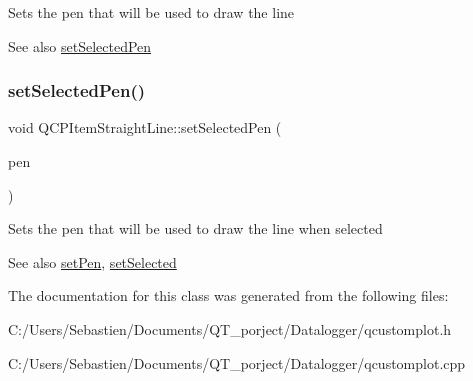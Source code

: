 Sets the pen that will be used to draw the line

\begin{DoxySeeAlso}{See also}
\hyperlink{class_q_c_p_item_straight_line_a5c33559498d33543fa95cf0a36e851ff}{set\+Selected\+Pen} 
\end{DoxySeeAlso}
\mbox{\label{class_q_c_p_item_straight_line_a5c33559498d33543fa95cf0a36e851ff}} 
\subsubsection{\texorpdfstring{set\+Selected\+Pen()}{setSelectedPen()}}
{\footnotesize\ttfamily void Q\+C\+P\+Item\+Straight\+Line\+::set\+Selected\+Pen (\begin{DoxyParamCaption}\item[{const Q\+Pen \&}]{pen }\end{DoxyParamCaption})}

Sets the pen that will be used to draw the line when selected

\begin{DoxySeeAlso}{See also}
\hyperlink{class_q_c_p_item_straight_line_a9f36c9c9e60d7d9ac084c80380ac8601}{set\+Pen}, \hyperlink{class_q_c_p_abstract_item_a203de94ad586cc44d16c9565f49d3378}{set\+Selected} 
\end{DoxySeeAlso}


The documentation for this class was generated from the following files\+:\begin{DoxyCompactItemize}
\item 
C\+:/\+Users/\+Sebastien/\+Documents/\+Q\+T\+\_\+porject/\+Datalogger/qcustomplot.\+h\item 
C\+:/\+Users/\+Sebastien/\+Documents/\+Q\+T\+\_\+porject/\+Datalogger/qcustomplot.\+cpp\end{DoxyCompactItemize}
